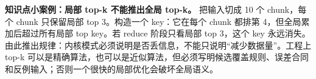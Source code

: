 \begin{casebox}
\textbf{知识点小案例：局部 top-k 不能推出全局 top-k。}
把输入切成 10 个 chunk，每个 chunk 只保留局部 top 3。构造一个 key：它在每个 chunk 都排第 4，但全局累加后超过所有局部 top key。若 reduce 阶段只看局部 top 3，这个 key 永远消失。由此推出规律：内核模式必须说明是否丢信息，不能只说明“减少数据量”。工程上 top-k 可以是精确算法，也可以是近似算法，但必须写明候选覆盖规则、误差合同和反例输入；否则一个很快的局部优化会破坏全局语义。
\end{casebox}
